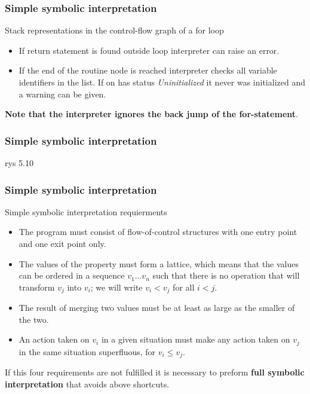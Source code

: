 \documentclass[presentation]{beamer}
\begin{document}
\begin{frame}
  \frametitle{Simple symbolic interpretation}
  \begin{block}{Stack representations in the control-flow graph of a for loop}
  \begin{itemize}
      \item If return statement is found outside loop interpreter can raise an error.
      \item If the end of the routine node is reached interpreter checks all variable identifiers in the list. If on has status \emph{Uninitialized} it never was initialized and a warning can be given.
  \end{itemize}
  \textbf{Note that the interpreter ignores the back jump of the for-statement}.
  \end{block}
  
\end{frame}

\begin{frame}
  \frametitle{Simple symbolic interpretation}
  rys 5.10
  
\end{frame}

\begin{frame}
  \frametitle{Simple symbolic interpretation}
  \begin{block}{Simple symbolic interpretation requierments}
  \begin{itemize}
      \item The program must consist of flow-of-control structures with one entry point and one exit point only.
      \item The values of the property must form a lattice, which means that the values can be ordered in a sequence $v_1...v_n$ such that there is no operation that will transform $v_j$ into $v_i$; we will write $v_i < v_j$ for all $i<j$.
      \item The result of merging two values must be at least as large as the smaller of the two.
      \item An action taken on $v_i$ in a given situation must make any action taken on $v_j$ in the same situation superfluous, for $v_i \leq v_j$.
  \end{itemize}
  \end{block}
  \begin{block}{}
  If this four requirements are not fulfilled it is necessary to preform \textbf{full symbolic interpretation} that avoids above shortcuts.
  \end{block}
\end{frame}
\end{document}
